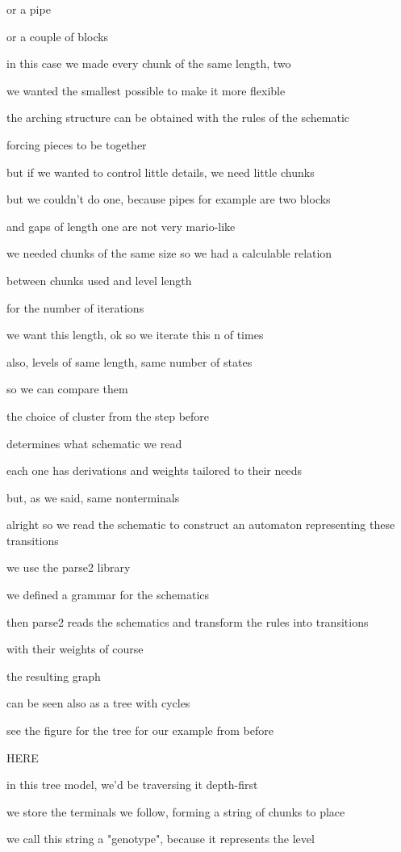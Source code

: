 \documentclass[conference]{IEEEtran}
\begin{document}
or a pipe

or a couple of blocks

in this case we made every chunk of the same length, two

we wanted the smallest possible to make it more flexible

the arching structure can be obtained with the rules of the schematic

forcing pieces to be together

but if we wanted to control little details, we need little chunks

but we couldn't do one, because pipes for example are two blocks

and gaps of length one are not very mario-like

we needed chunks of the same size so we had a calculable relation

between chunks used and level length

for the number of iterations

we want this length, ok so we iterate this n of times

also, levels of same length, same number of states

so we can compare them

the choice of cluster from the step before

determines what schematic we read

each one has derivations and weights tailored to their needs

but, as we said, same nonterminals

alright so we read the schematic to construct an automaton representing these transitions

we use the parse2 library

we defined a grammar for the schematics

then parse2 reads the schematics and transform the rules into transitions

with their weights of course

the resulting graph

can be seen also as a tree with cycles

see the figure for the tree for our example from before

HERE

in this tree model, we'd be traversing it depth-first

we store the terminals we follow, forming a string of chunks to place

we call this string a "genotype", because it represents the level
\end{document}
